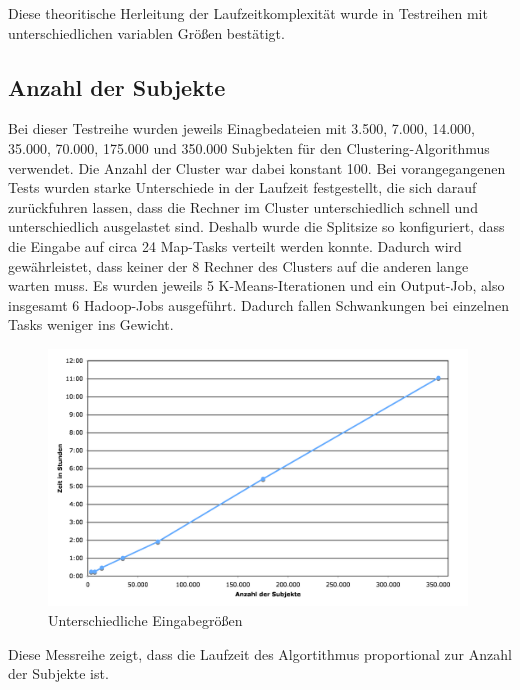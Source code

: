 \documentclass[a4paper]{llncs}
\begin{document}
Diese theoritische Herleitung der Laufzeitkomplexität wurde in Testreihen mit unterschiedlichen variablen Größen bestätigt.

\subsection{Anzahl der Subjekte}
Bei dieser Testreihe wurden jeweils Einagbedateien mit 3.500, 7.000, 14.000, 35.000, 70.000, 175.000 und 350.000 Subjekten für den Clustering-Algorithmus verwendet.
Die Anzahl der Cluster war dabei konstant 100.
Bei vorangegangenen Tests wurden starke Unterschiede in der Laufzeit festgestellt, die sich darauf zurückfuhren lassen, dass die Rechner im Cluster unterschiedlich schnell und unterschiedlich ausgelastet sind. Deshalb wurde die Splitsize so konfiguriert, dass die Eingabe auf circa 24 Map-Tasks verteilt werden konnte. Dadurch wird gewährleistet, dass keiner der 8 Rechner des Clusters auf die anderen lange warten muss.
Es wurden jeweils 5 K-Means-Iterationen und ein Output-Job, also insgesamt 6 Hadoop-Jobs ausgeführt. Dadurch fallen Schwankungen bei einzelnen Tasks weniger ins Gewicht.
\begin{figure}[!ht]
\centering
\includegraphics[width=0.99\textwidth]{charts/subjects.png}
\caption{Unterschiedliche Eingabegrößen}
\label{fig:subjects}
\end{figure}
Diese Messreihe zeigt, dass die Laufzeit des Algortithmus proportional zur Anzahl der Subjekte ist.
\end{document}
